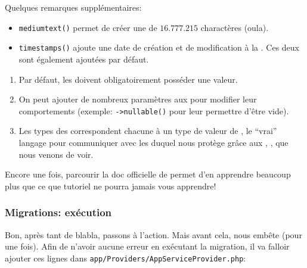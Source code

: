 \documentclass[internal]{nhitec_design}
\begin{document}
Quelques remarques supplémentaires:

\begin{itemize}[resume, before = \vspace*{-\dimexpr\topsep+\partopsep\relax}]
    \item \verb|mediumtext()| permet de créer une \column{} de $16.777.215$ charactères (oula).
    \item \verb|timestamps()| ajoute une date de création et de modification à la \table{}. Ces deux \columns{} sont également ajoutées par défaut.
\end{itemize}

\begin{enumerate}
    \item Par défaut, les \columns{} doivent obligatoirement posséder une valeur.
    \item On peut ajouter de nombreux paramètres aux \columns{} pour modifier leur comportements (exemple: \verb|->nullable()| pour leur permettre d'être vide).
    \item Les types des \column{} correspondent chacune à un type de valeur de \mysql{}, le ``vrai'' langage pour communiquer avec les \db{} duquel \laravel{} nous protège grâce aux \models{}, \migrations{}, \tables{} que nous venons de voir.
\end{enumerate}

Encore une fois, parcourir la doc officielle de \laravel{} permet d'en apprendre beaucoup plus que ce que tutoriel ne pourra jamais vous apprendre!

\subsubsection{Migrations: exécution}

Bon, après tant de blabla, passons à l'action. Mais avant cela, \laravel{} nous embête (pour une fois). Afin de n'avoir aucune erreur en exécutant la migration, il va falloir ajouter ces lignes dans \verb|app/Providers/AppServiceProvider.php|:
\end{document}
